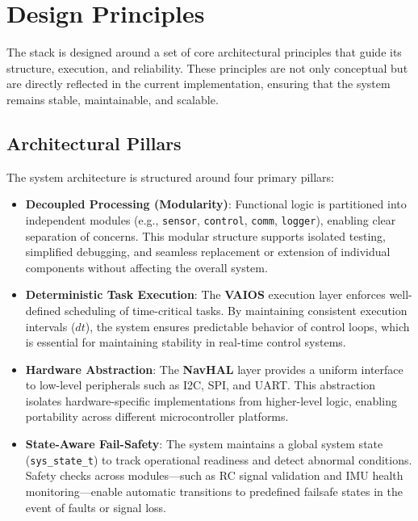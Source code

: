 \section{Design Principles}
\label{sec:design}

The stack is designed around a set of core architectural principles that guide its structure, execution, and reliability. These principles are not only conceptual but are directly reflected in the current implementation, ensuring that the system remains stable, maintainable, and scalable.

\subsection{Architectural Pillars}

The system architecture is structured around four primary pillars:

\begin{itemize}
    \item \textbf{Decoupled Processing (Modularity)}:  
    Functional logic is partitioned into independent modules (e.g., \texttt{sensor}, \texttt{control}, \texttt{comm}, \texttt{logger}), enabling clear separation of concerns. This modular structure supports isolated testing, simplified debugging, and seamless replacement or extension of individual components without affecting the overall system.

    \item \textbf{Deterministic Task Execution}:  
    The \textbf{VAIOS} execution layer enforces well-defined scheduling of time-critical tasks. By maintaining consistent execution intervals (\(dt\)), the system ensures predictable behavior of control loops, which is essential for maintaining stability in real-time control systems.

    \item \textbf{Hardware Abstraction}:  
    The \textbf{NavHAL} layer provides a uniform interface to low-level peripherals such as I2C, SPI, and UART. This abstraction isolates hardware-specific implementations from higher-level logic, enabling portability across different microcontroller platforms.

    \item \textbf{State-Aware Fail-Safety}:  
    The system maintains a global system state (\texttt{sys\_state\_t}) to track operational readiness and detect abnormal conditions. Safety checks across modules—such as RC signal validation and IMU health monitoring—enable automatic transitions to predefined failsafe states in the event of faults or signal loss.
\end{itemize}

